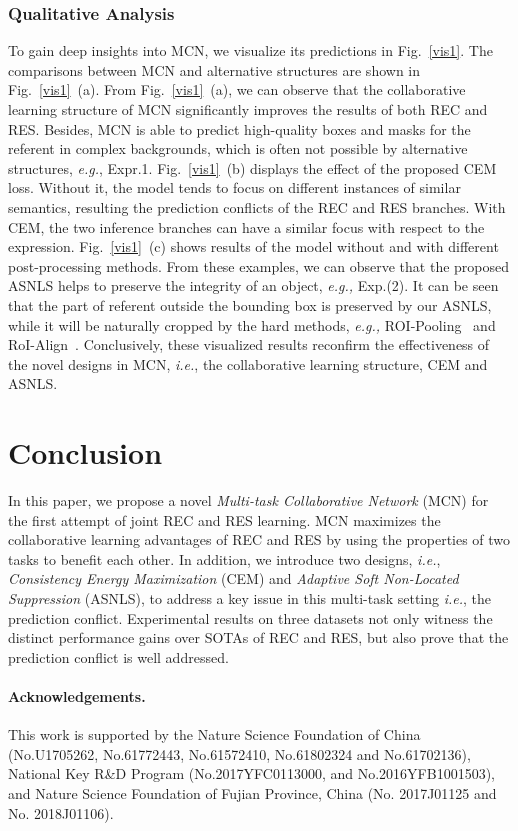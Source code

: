 \documentclass[10pt,twocolumn,letterpaper]{article}
\begin{document}
\subsubsection{Qualitative Analysis}
To gain  deep insights into MCN, we  visualize its predictions in Fig.~\ref{vis1}.   The  comparisons between MCN and alternative structures are shown in Fig.~\ref{vis1}~(a).  From Fig.~\ref{vis1}~(a),  we can observe that the collaborative learning structure of MCN  significantly improves the results of both REC and RES.  Besides, MCN is able to predict high-quality boxes and masks for the referent in complex  backgrounds, which is often not possible  by alternative structures,  \emph{e.g.}, Expr.1. 
Fig.~\ref{vis1}~(b) displays the effect of the proposed CEM loss. 
Without it, the model tends to focus on different instances of similar semantics,  resulting the prediction conflicts of the REC and RES branches. 
With CEM, the two inference branches can have a similar focus with respect to the expression. 
Fig.~\ref{vis1}~(c) shows results of the model without and with different post-processing methods. 
From these examples, we can observe that the proposed ASNLS helps to preserve the integrity of an object, \emph{e.g.,} Exp.(2). It can be seen that the part of referent outside the bounding box is preserved by our ASNLS, while it will be naturally cropped  by the hard  methods, \emph{e.g.,}  ROI-Pooling~\cite{ren2017faster} and RoI-Align~\cite{he2017mask}. Conclusively, these visualized results reconfirm the effectiveness of the novel designs in MCN, \emph{i.e.}, the collaborative learning structure, CEM and ASNLS. 

\section{Conclusion}
In this paper, we propose a novel \emph{Multi-task Collaborative Network} (MCN) for the first attempt of joint REC and RES learning. 
MCN maximizes the collaborative learning advantages of REC and RES by using the properties of two tasks to benefit each other.
In addition, we  introduce  two  designs, \emph{i.e.}, \emph{Consistency Energy Maximization} (CEM) and \emph{Adaptive Soft Non-Located Suppression} (ASNLS),  to address a key issue in this multi-task setting \emph{i.e.}, the prediction conflict.
Experimental results on three  datasets not only witness the distinct performance gains over SOTAs of REC and RES,  but also prove that the  prediction conflict is well addressed. 

\paragraph{Acknowledgements.}
\footnotesize{This work is supported by the Nature Science Foundation of China (No.U1705262, No.61772443, No.61572410, No.61802324 and No.61702136), 
	National Key R\&D Program (No.2017YFC0113000, and No.2016YFB1001503), 
	and Nature Science Foundation of Fujian Province, China (No. 2017J01125 and No. 2018J01106).}

{\small


}
\end{document}
